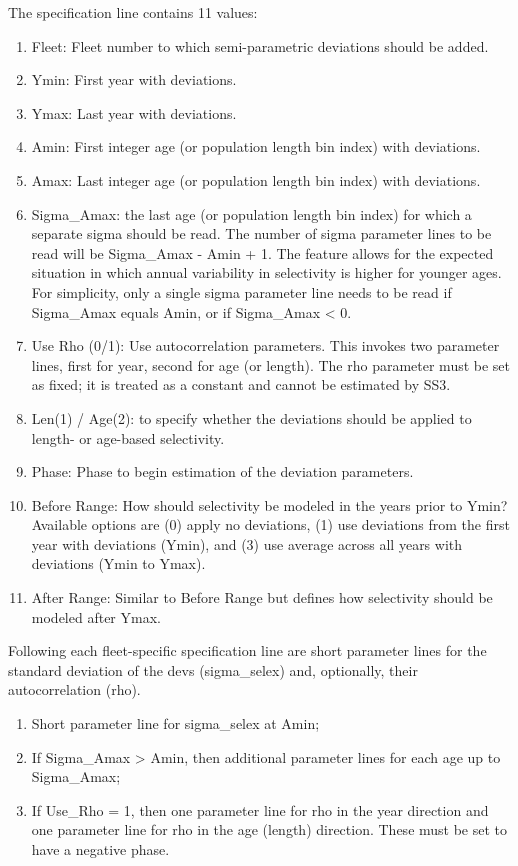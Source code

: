 The specification line contains 11 values:
\begin{enumerate}
	\item Fleet: Fleet number to which semi-parametric deviations should be added.
	\item Ymin: First year with deviations.
	\item Ymax: Last year with deviations.
	\item Amin: First integer age (or population length bin index) with deviations.
	\item Amax: Last integer age (or population length bin index) with deviations.
	\item Sigma\_Amax: the last age (or population length bin index) for which a separate sigma should be read. The number of sigma parameter lines to be read will be Sigma\_Amax - Amin + 1. The feature allows for the expected situation in which annual variability in selectivity is higher for younger ages. For simplicity, only a single sigma parameter line needs to be read if Sigma\_Amax equals Amin, or if Sigma\_Amax < 0.
	\item Use Rho (0/1): Use autocorrelation parameters. This invokes two parameter lines, first for year, second for age (or length). The rho parameter must be set as fixed; it is treated as a constant and cannot be estimated by SS3.
	\item Len(1) / Age(2): to specify whether the deviations should be applied to length- or age-based selectivity.
	\item Phase: Phase to begin estimation of the deviation parameters.
	\item Before Range: How should selectivity be modeled in the years prior to Ymin? Available options are (0) apply no deviations, (1) use deviations from the first year with deviations (Ymin), and (3) use average across all years with deviations (Ymin to Ymax).
	\item After Range: Similar to Before Range but defines how selectivity should be modeled after Ymax.
\end{enumerate}

Following each fleet-specific specification line are short parameter lines for the standard deviation of the devs (sigma\_selex) and, optionally, their autocorrelation (rho).

\begin{enumerate}
	\item Short parameter line for sigma\_selex at Amin;
	\item If Sigma\_Amax > Amin, then additional parameter lines for each age up to Sigma\_Amax;
	\item If Use\_Rho = 1, then one parameter line for rho in the year direction and one parameter line for rho in the age (length) direction. These must be set to have a negative phase.
\end{enumerate}

